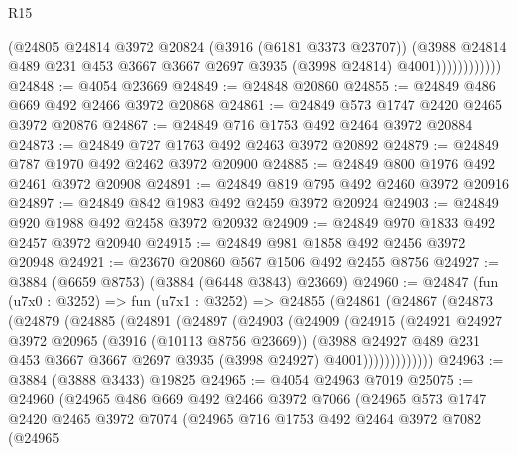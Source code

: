 \begin{lexlean}{R15}
\begin{coremodule}
                        (@24805
                          @24814
                          @3972
                          @20824
                          (@3916 (@6181 @3373 @23707))
                          (@3988
                            @24814
                            @489
                            @231
                            @453
                            @3667
                            @3667
                            @2697
                            @3935
                            (@3998 @24814)
                            @4001))))))))))))
@24848 := @4054 @23669
@24849 := @24848 @20860
@24855 := @24849 @486 @669 @492 @2466 @3972 @20868
@24861 := @24849 @573 @1747 @2420 @2465 @3972 @20876
@24867 := @24849 @716 @1753 @492 @2464 @3972 @20884
@24873 := @24849 @727 @1763 @492 @2463 @3972 @20892
@24879 := @24849 @787 @1970 @492 @2462 @3972 @20900
@24885 := @24849 @800 @1976 @492 @2461 @3972 @20908
@24891 := @24849 @819 @795 @492 @2460 @3972 @20916
@24897 := @24849 @842 @1983 @492 @2459 @3972 @20924
@24903 := @24849 @920 @1988 @492 @2458 @3972 @20932
@24909 := @24849 @970 @1833 @492 @2457 @3972 @20940
@24915 := @24849 @981 @1858 @492 @2456 @3972 @20948
@24921 := @23670 @20860 @567 @1506 @492 @2455 @8756
@24927 := @3884 (@6659 @8753) (@3884 (@6448 @3843) @23669)
@24960 := @24847
    (fun (u7x0 : @3252) =>
    fun (u7x1 : @3252) =>
    @24855
      (@24861
        (@24867
          (@24873
            (@24879
              (@24885
                (@24891
                  (@24897
                    (@24903
                      (@24909
                        (@24915
                          (@24921
                            @24927
                            @3972
                            @20965
                            (@3916 (@10113 @8756 @23669))
                            (@3988
                              @24927
                              @489
                              @231
                              @453
                              @3667
                              @3667
                              @2697
                              @3935
                              (@3998 @24927)
                              @4001)))))))))))))
@24963 := @3884 (@3888 @3433) @19825
@24965 := @4054 @24963 @7019
@25075 := @24960
    (@24965
      @486
      @669
      @492
      @2466
      @3972
      @7066
      (@24965
        @573
        @1747
        @2420
        @2465
        @3972
        @7074
        (@24965
          @716
          @1753
          @492
          @2464
          @3972
          @7082
          (@24965

\end{coremodule}
\end{lexlean}

